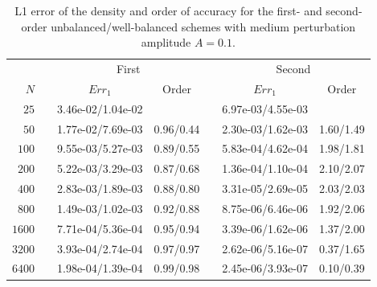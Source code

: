\begin{table}\centering
\caption{L1 error of the density and order of accuracy for the first- and second-order unbalanced/well-balanced schemes with medium perturbation amplitude $A=0.1$.}
\label{table:OVS_Amedium}
\begin{tabular}{@{}rcccccc@{}}\toprule
& \phantom{a} & \multicolumn{2}{c}{First} & \phantom{ab} & \multicolumn{2}{c}{Second}\\
\cmidrule{3-4} \cmidrule{6-7}
$N$ && $Err_1$ & Order && $Err_1$ & Order\\ \midrule
$25$ && 3.46e-02/1.04e-02 &&& 6.97e-03/4.55e-03 &\\
$50$ && 1.77e-02/7.69e-03 & 0.96/0.44 && 2.30e-03/1.62e-03 & 1.60/1.49\\
$100$ && 9.55e-03/5.27e-03 & 0.89/0.55 && 5.83e-04/4.62e-04 & 1.98/1.81\\
$200$ && 5.22e-03/3.29e-03 & 0.87/0.68 && 1.36e-04/1.10e-04 & 2.10/2.07\\
$400$ && 2.83e-03/1.89e-03 & 0.88/0.80 && 3.31e-05/2.69e-05 & 2.03/2.03\\
$800$ && 1.49e-03/1.02e-03 & 0.92/0.88 && 8.75e-06/6.46e-06 & 1.92/2.06\\
$1600$ && 7.71e-04/5.36e-04 & 0.95/0.94 && 3.39e-06/1.62e-06 & 1.37/2.00\\
$3200$ && 3.93e-04/2.74e-04 & 0.97/0.97 && 2.62e-06/5.16e-07 & 0.37/1.65\\
$6400$ && 1.98e-04/1.39e-04 & 0.99/0.98 && 2.45e-06/3.93e-07 & 0.10/0.39\\
\bottomrule
\end{tabular}
\end{table}

